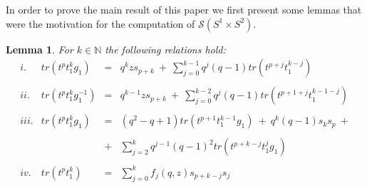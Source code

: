 \documentclass[11pt]{amsart}
\newtheorem{lemma}{Lemma}
\begin{document}
In order to prove the main result of this paper we first present some lemmas that were the motivation for the computation of $\mathcal{S}(S^1 \times S^2)$.



\begin{lemma}\label{newlem}
For $k \in \mathbb{N}$ the following relations hold:
\[
\begin{array}{llll}
i. & tr(t^pt_1^kg_1) & = & q^k z s_{p+k}\ + \ \sum_{j=0}^{k-1}{q^j(q-1)tr(t^{p+j}t_1^{k-j})} \\
&&&\\
ii. & tr(t^pt_1^kg_1^{-1}) & = & q^{k-1} z s_{p+k}\ +\ \sum_{j=0}^{k-2}{q^j(q-1)tr(t^{p+1+j}t_1^{k-1-j})} \\
&&&\\
iii. & tr(t^pt_1^kg_1) & = & (q^2-q+1)tr(t^{p+1}t_1^{k-1}g_1)\ +\  q^k(q-1)s_ks_p\ +\\
&&&\\
&& + & \sum_{j=2}^{k}{q^{j-1}(q-1)^2tr(t^{p+k-j}t_1^{j}g_1)}\\
&&&\\
iv. & tr(t^pt_1^k) & = & \sum_{j=0}^{k}{f_j(q,z)s_{p+k-j}s_{j}}
\end{array}
\]
\end{lemma}
\end{document}
